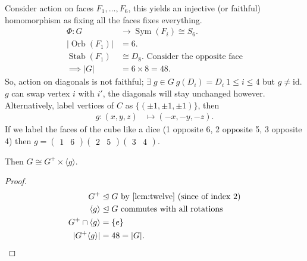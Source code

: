 Consider action on faces $F_1, \dots, F_6$, this yields an injective (or faithful) homomorphism as fixing all the faces fixes everything.
%
\begin{align*}
    \Phi: G &\to \operatorname{Sym}(F_i) \cong S_6. \\
    |\operatorname{Orb}(F_1)| &= 6. \\
    \operatorname{Stab}(F_1) &\cong D_8. \text{ Consider the opposite face} \\
    \implies |G| &= 6 \times 8 = 48.
\end{align*} 
So, action on diagonals is not faithful; $\exists \; g \in G \ g(D_i) = D_i \ 1 \leq i \leq 4$ but $g \neq \text{id}$. 
$g$ can swap vertex $i$ with $i'$, the diagonals will stay unchanged however.
Alternatively, label vertices of $C$ as $\{(\pm 1, \pm 1, \pm 1)\}$, then 
\begin{align*}
    g : (x, y, z) &\mapsto (-x, -y, -z).
\end{align*} 
If we label the faces of the cube like a dice (1 opposite 6, 2 opposite 5, 3 opposite 4) then $g = \begin{pmatrix} 1 & 6\end{pmatrix} \begin{pmatrix}2 & 5\end{pmatrix} \begin{pmatrix}3 & 4\end{pmatrix}$.

Then $G \cong G^+ \times \langle g \rangle$.
\begin{proof}
    \begin{align*}
        G^+ &\trianglelefteq G \text{ by \Cref{lem:twelve} (since of index 2)} \\
        \langle g \rangle &\trianglelefteq G \text{ commutes with all rotations} \\
        G^+ \cap \langle g \rangle &= \{ e \} \\
        | G^+ \langle g \rangle | &= 48 = |G|.
    \end{align*} 
\end{proof} 

